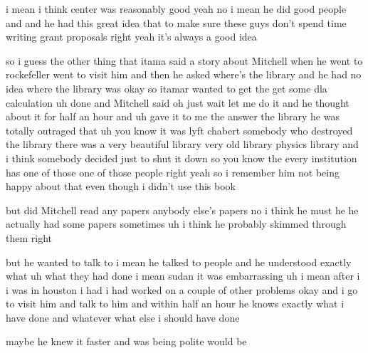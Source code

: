 \begin{description}
i mean i think center was reasonably good yeah no i mean he did good people and and he had this great idea that to make sure these guys don't spend time writing grant proposals right yeah it's always a good idea

so i guess the other thing that itama said a story about Mitchell when he went to rockefeller went to visit him and then he asked where's the library and he had no idea where the library was okay so itamar wanted to get the get some dla calculation uh done and Mitchell said oh just wait let me do it and he thought about it for half an hour and uh gave it to me the answer the library he was totally outraged that uh you know it was lyft chabert somebody who destroyed the library there was a very beautiful library very old library physics library and i think somebody decided just to shut it down so you know the every institution has one of those one of those people right yeah so i remember him not being happy about that even though i didn't use this book

but did Mitchell read any papers anybody else's papers no i think he must he he actually had some papers sometimes uh i think he probably skimmed through them right

but he wanted to talk to i mean he talked to people and he understood exactly what uh what they had done i mean sudan it was embarrassing uh i mean after i i was in houston i had i had worked on a couple of other problems okay and i go to visit him and talk to him and within half an hour he knows exactly what i have done and whatever what else i should have done

maybe he knew it faster and was being polite would be


\end{description}

